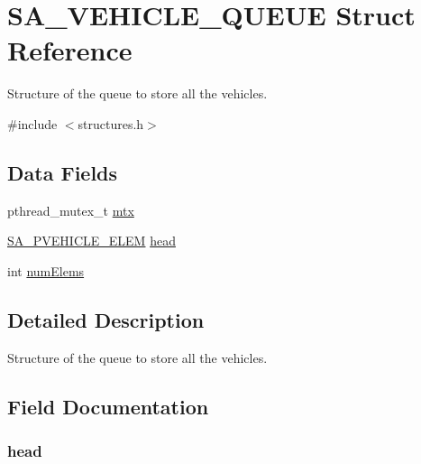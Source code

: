 \hypertarget{struct_s_a___v_e_h_i_c_l_e___q_u_e_u_e}{}\section{S\+A\+\_\+\+V\+E\+H\+I\+C\+L\+E\+\_\+\+Q\+U\+E\+UE Struct Reference}
\label{struct_s_a___v_e_h_i_c_l_e___q_u_e_u_e}


Structure of the queue to store all the vehicles.  




{\ttfamily \#include $<$structures.\+h$>$}

\subsection*{Data Fields}
\begin{DoxyCompactItemize}
\item 
pthread\+\_\+mutex\+\_\+t \hyperlink{struct_s_a___v_e_h_i_c_l_e___q_u_e_u_e_a2680f9fe5653a596c7e779b838180fdc}{mtx}
\item 
\hyperlink{structures_8h_a50fee34ecd2bb037e03fab750c7758b0}{S\+A\+\_\+\+P\+V\+E\+H\+I\+C\+L\+E\+\_\+\+E\+L\+EM} \hyperlink{struct_s_a___v_e_h_i_c_l_e___q_u_e_u_e_aa3d8fcec288e167d6ba7ab411a4abb6a}{head}
\item 
int \hyperlink{struct_s_a___v_e_h_i_c_l_e___q_u_e_u_e_ab9fc9205a1dbcc638f9a9f928d8c857d}{num\+Elems}
\end{DoxyCompactItemize}


\subsection{Detailed Description}
Structure of the queue to store all the vehicles. 

\subsection{Field Documentation}
\subsubsection[{\texorpdfstring{head}{head}}]{ head}\hypertarget{struct_s_a___v_e_h_i_c_l_e___q_u_e_u_e_aa3d8fcec288e167d6ba7ab411a4abb6a}{}\label{struct_s_a___v_e_h_i_c_l_e___q_u_e_u_e_aa3d8fcec288e167d6ba7ab411a4abb6a}
